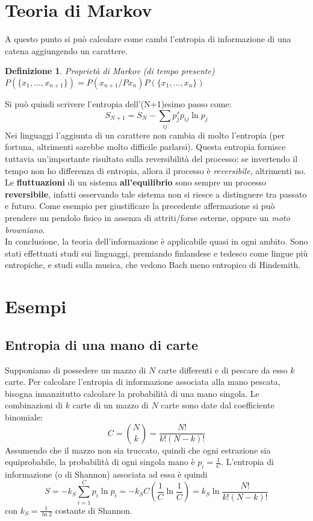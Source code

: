\documentclass[12pt, a4paper]{book}
\theoremstyle{theorem}
\newtheorem{definition}{Definizione}[section]
\begin{document}
		\section{Teoria di Markov}
			A questo punto si può calcolare come cambi l'entropia di informazione di una catena aggiungendo un carattere.
			\begin{definition}
				Proprietà di Markov (di tempo presente)\\
				$P(\{x_1,...,x_{n+1}\})=P(x_{n+1}/Px_n)P(\{x_1,...,x_{n}\})$
			\end{definition}
			Si può quindi scrivere l'entropia dell'(N+1)esimo passo come:
			\begin{equation}
				S_{N+1}=S_N-\sum_{ij}p_j^sp_{ij}\ln p_j
			\end{equation}
			Nei linguaggi l'aggiunta di un carattere non cambia di molto l'entropia (per fortuna, altrimenti sarebbe molto difficile parlarsi).
			Questa entropia fornisce tuttavia un'importante risultato sulla reversibilità del processo:
			se invertendo il tempo non ho differenza di entropia, allora il processo è \textit{reversibile}, altrimenti no.
			Le \textbf{fluttuazioni} di un sistema \textbf{all'equilibrio} sono sempre un processo \textbf{reversibile}, infatti osservando tale sistema non si riesce a distinguere tra passato e futuro.
			Come esempio per giustificare la precedente affermazione si può prendere un pendolo fisico in assenza di attriti/forse esterne, oppure un \textit{moto browniano}.\\
			In conclusione, la teoria dell'informazione è applicabile quasi in ogni ambito.
			Sono stati effettuati studi sui linguaggi, premiando finlandese e tedesco come lingue più entropiche, e studi sulla musica, che vedono Bach meno entropico di Hindemith.
		
		\section{Esempi}
			\subsection{Entropia di una mano di carte}
				Supponiamo di possedere un mazzo di $N$ carte differenti e di pescare da esso $k$ carte.
				Per calcolare l'entropia di informazione associata alla mano pescata, bisogna innanzitutto calcolare la probabilità di una mano singola.
				Le combinazioni di $k$ carte di un mazzo di $N$ carte sono date dal coefficiente binomiale:
				\begin{equation}
					C=\binom{N}{k}=\frac{N!}{k!(N-k)!}
				\end{equation}
				Assumendo che il mazzo non sia truccato, quindi che ogni estrazione sia equiprobabile, la probabilità di ogni singola mano è $p_{i}=\frac{1}{C}$.
				L'entropia di informazione (o di Shannon) associata ad essa è quindi 
				\begin{equation}
					S=-k_{S}\sum_{i=1}^{C}p_{i}\ln{p_{i}}=-k_{S}C\left(\frac{1}{C}\ln{\frac{1}{C}}\right)=k_{S}\ln{\frac{N!}{k!(N-k)!}}
				\end{equation}
				con $k_{S}=\frac{1}{\ln2}$ costante di Shannon.
\end{document}
